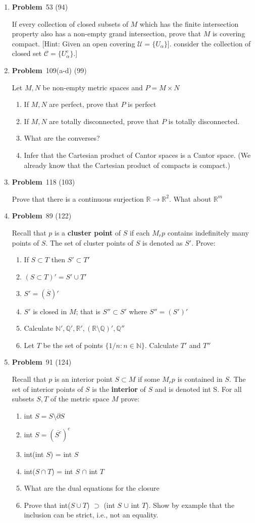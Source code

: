 \documentclass[12pt]{amsart}
\newcommand{\benu}{\begin{enumerate}}
\newcommand{\eenu}{\end{enumerate}}
\theoremstyle{definition}
\newcommand{\mbR}{\mathbb{R}}
\newcommand{\mbN}{\mathbb{N}}
\newcommand{\mbQ}{\mathbb{Q}}
\newcommand{\mcU}{\mathcal{U}}
\newcommand{\mc}[1]{\mathcal{#1}}
\newcommand{\itep}{\item {\bfseries Problem}\ }
\begin{document}
\begin{enumerate}[series=p]
\itep 53 (94)

If every collection of closed subsets of $M$ which has the finite intersection property also has a non-empty grand intersection, prove that $M$ is covering compact.  [Hint: Given an open covering $\mcU = \{U_\alpha\}]$. consider the collection of closed set $\mc{C} = \{U_\alpha^c\}$.]
\newpage

\itep 109(a-d) (99)

Let $M, N$ be non-empty metric spaces and $P = M \times N$
	\benu
		\item If $M,N$ are perfect, prove that $P$ is perfect
		\item If $M, N$ are totally disconnected, prove that $P$ is totally disconnected.
		\item What are the converses?
		\item Infer that the Cartesian product of Cantor spaces is a Cantor space.  (We already know that the Cartesian product of compacts is compact.)
	\eenu

\newpage

\itep 118 (103)

Prove that there is a continuous surjection  $\mbR \to \mbR^2$.  What about $\mbR^m$
\newpage

\itep 89 (122)

Recall that $p$ is a \textbf{cluster point} of $S$ if each $M_rp$ contains indefinitely many points of $S$.  The set of cluster points of $S$ is denoted as $S'$.  Prove:
	\benu
		\item If $S \subset T$ then $S' \subset T'$
		\item $(S \subset T)' = S' \cup T'$
		\item $S' = (\overline{S})'$
		\item $S'$ is closed in $M$; that is $S'' \subset S'$ where $S'' = (S')'$
		\item Calculate $\mbN', \mbQ', \mbR', (\mbR \setminus \mbQ)', \mbQ''$
		\item Let $T$ be the set of points $\{1/n : n \in \mbN\}$.  Calculate $T'$ and $T''$
	\eenu
\newpage

\itep 91 (124)

Recall that $p$ is an interior point $S \subset M$ if some $M_rp$ is contained in $S$.  The set of interior points of $S$ is the \textbf{interior} of $S$ and is denoted int S.  For all subsets $S, T$ of the metric space $M$ prove:
	\benu
		\item int $S = S \setminus \partial S$
		\item int $S = (\overline{S^c})^c$
		\item int(int $S$) = int $S$
		\item int($S \cap T$) = int $S$ $\cap$ int $T$
		\item What are the dual equations for the closure
		\item Prove that int($S \cup T$) $\supset$ (int $S$ $\cup$ int $T$).  Show by example that the inclusion can be strict, i.e., not an equality.
	\eenu
\newpage


\end{enumerate}
\end{document}
